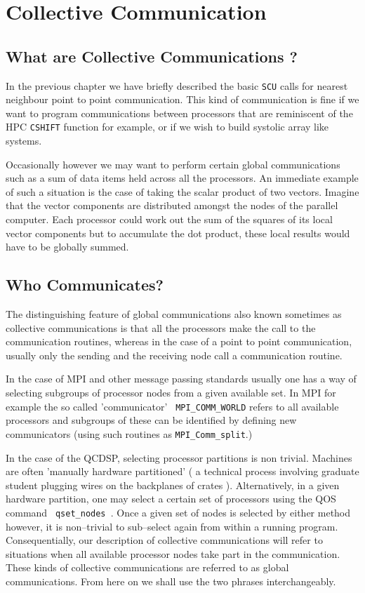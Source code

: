 \chapter{Collective Communication}
\section{What are Collective Communications ?}
In the previous chapter we have briefly described the basic {\tt SCU} 
calls for nearest neighbour point to point communication. This 
kind of communication is fine if we want to program communications
between processors that are reminiscent of the HPC {\tt CSHIFT} 
function for example, or if we wish to build systolic array like 
systems.

Occasionally however we may want to perform certain global communications
such as a sum of data items held across all the processors. An immediate
example of such a situation is the case of taking the scalar product of two vectors. Imagine that the vector
components are distributed amongst the nodes of the parallel computer. Each 
processor could work out the sum of the squares of its local vector components
but to accumulate the dot product, these local results would have to be
globally summed. 

\section{Who Communicates?}
The distinguishing feature of global communications also known
sometimes as collective communications is that all the processors make
the call to the communication routines, whereas in the case of a point
to point communication, usually only the sending and the receiving
node call a communication routine.

In the case of MPI and other message passing standards usually one has
a way of selecting subgroups of processor nodes from a given available
set. In MPI for example the so called 'communicator' {\tt
MPI\_COMM\_WORLD} refers to all available processors and subgroups of
these can be identified by defining new communicators (using such
routines as {\tt MPI\_Comm\_split}.)

In the case of the QCDSP, selecting processor partitions is non
trivial. Machines are often 'manually hardware partitioned' ( a
technical process involving graduate student plugging wires on the
backplanes of crates ).  Alternatively, in a given hardware partition,
one may select a certain set of processors using the QOS command {\tt
qset\_nodes }.  Once a given set of nodes is selected by either method
however, it is non--trivial to sub--select again from within a running
program.  Consequentially, our description of collective
communications will refer to situations when all available processor
nodes take part in the communication. These kinds of collective
communications are referred to as global communications. From here on
we shall use the two phrases interchangeably.

